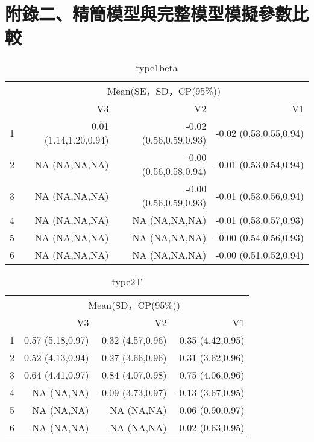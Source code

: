 \section*{附錄二、精簡模型與完整模型模擬參數比較}
\begin{table}[h]
\centering
\caption{type1beta}
\label{tab:type1beta}
\begin{tabular}{crrr}
\toprule
      & \multicolumn{3}{c}{Mean(SE，SD，CP(95\%))} \\
\cmidrule{2-4}      & V3    & V2    & V1 \\
\midrule
1     & 0.01 (1.14,1.20,0.94) & -0.02 (0.56,0.59,0.93) & -0.02 (0.53,0.55,0.94) \\
2     & NA (NA,NA,NA) & -0.00 (0.56,0.58,0.94) & -0.01 (0.53,0.54,0.94) \\
3     & NA (NA,NA,NA) & -0.00 (0.56,0.59,0.93) & -0.01 (0.53,0.56,0.94) \\
4     & NA (NA,NA,NA) & NA (NA,NA,NA) & -0.01 (0.53,0.57,0.93) \\
5     & NA (NA,NA,NA) & NA (NA,NA,NA) & -0.00 (0.54,0.56,0.93) \\
6     & NA (NA,NA,NA) & NA (NA,NA,NA) & -0.00 (0.51,0.52,0.94) \\
\bottomrule
\end{tabular}
\end{table}

\begin{table}[h]
\centering
\caption{type2T}
\label{tab:type2T}
\begin{tabular}{crrr}
\toprule
      & \multicolumn{3}{c}{Mean(SD，CP(95\%))} \\
\cmidrule{2-4}      & V3    & V2    & V1 \\
\midrule
1     & 0.57 (5.18,0.97) & 0.32 (4.57,0.96) & 0.35 (4.42,0.95) \\
2     & 0.52 (4.13,0.94) & 0.27 (3.66,0.96) & 0.31 (3.62,0.96) \\
3     & 0.64 (4.41,0.97) & 0.84 (4.07,0.98) & 0.75 (4.06,0.96) \\
4     & NA (NA,NA) & -0.09 (3.73,0.97) & -0.13 (3.67,0.95) \\
5     & NA (NA,NA) & NA (NA,NA) & 0.06 (0.90,0.97) \\
6     & NA (NA,NA) & NA (NA,NA) & 0.02 (0.63,0.95) \\
\bottomrule
\end{tabular}
\end{table}

